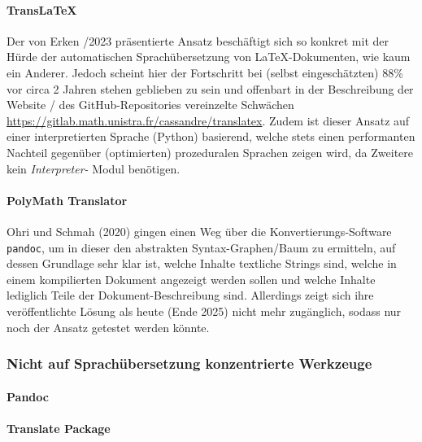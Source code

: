 \paragraph*{TransLaTeX}\par
Der von Erken /2023 präsentierte Ansatz beschäftigt sich so konkret mit der Hürde der automatischen Sprachübersetzung von \LaTeX{}-Dokumenten, wie kaum ein Anderer. Jedoch scheint hier der Fortschritt bei (selbst eingeschätzten) 88\% vor circa 2 Jahren stehen geblieben zu sein und offenbart in der Beschreibung der Website / des GitHub-Repositories vereinzelte Schwächen \url{https://gitlab.math.unistra.fr/cassandre/translatex}. Zudem ist dieser Ansatz auf einer interpretierten Sprache (Python) basierend, welche stets einen performanten Nachteil gegenüber (optimierten) prozeduralen Sprachen zeigen wird, da Zweitere kein \textit{Interpreter-} Modul benötigen.

\paragraph*{PolyMath Translator}
Ohri und Schmah (2020) gingen einen Weg über die Konvertierungs-Software \texttt{pandoc}, um in dieser den abstrakten Syntax-Graphen/Baum zu ermitteln, auf dessen Grundlage sehr klar ist, welche Inhalte textliche Strings sind, welche in einem kompilierten Dokument angezeigt werden sollen und welche Inhalte lediglich Teile der Dokument-Beschreibung sind. Allerdings zeigt sich ihre veröffentlichte Lösung als heute (Ende 2025) nicht mehr zugänglich, sodass nur noch der Ansatz getestet werden könnte.

\subsubsection{Nicht auf Sprachübersetzung konzentrierte Werkzeuge}
\paragraph*{Pandoc}\par
\paragraph*{Translate Package}\par



